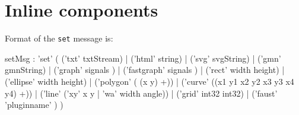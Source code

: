 \documentclass[a4paper,twoside]{report}
\newcommand{\sublevel}[1]	{\section{#1}}
\newcommand{\OSC}[1]		{\texttt{#1}}
\begin{document}
\sublevel{Inline components}
\label{inlineset}

Format of the \OSC{set} message is:
\begin{rail}
setMsg : 'set' (
	('txt' txtStream) |
	('html' string) |
	('svg' svgString) |
	('gmn' gmnString) |
	('graph' signals ) |
	('fastgraph' signals ) |
	('rect' width height) |
	('ellipse' width height) |
	('polygon' ( (x y) +)) |
	('curve' ((x1 y1 x2 y2 x3 y3 x4 y4) +)) |
	('line' ('xy' x y | 'wa' width angle)) |
	('grid' int32 int32) |
	('faust' 'pluginname' )
)
\end{rail}
\end{document}
